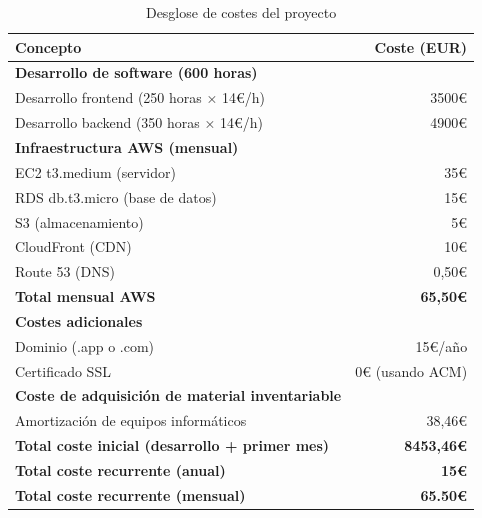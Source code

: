 \begin{table}[h]
	\centering
	\begin{tabular}{lr}
		\toprule
		\textbf{Concepto} & \textbf{Coste (EUR)} \\
		\midrule
		\textbf{Desarrollo de software (600 horas)} & \\
		\quad Desarrollo frontend (250 horas × 14€/h) & 3500€ \\
		\quad Desarrollo backend (350 horas × 14€/h) & 4900€ \\
		\midrule
		\textbf{Infraestructura AWS (mensual)} & \\
		\quad EC2 t3.medium (servidor) & 35€ \\
		\quad RDS db.t3.micro (base de datos) & 15€ \\
		\quad S3 (almacenamiento) & 5€ \\
		\quad CloudFront (CDN) & 10€ \\
		\quad Route 53 (DNS) & 0,50€ \\
		\quad \textbf{Total mensual AWS} & \textbf{65,50€} \\
		\midrule
		\textbf{Costes adicionales} & \\
		\quad Dominio (.app o .com) & 15€/año \\
		\quad Certificado SSL & 0€ (usando ACM) \\
		\midrule
		\textbf{Coste de adquisición de material inventariable} \\
		\quad Amortización de equipos informáticos & 38,46€ \\
		\midrule
		\textbf{Total coste inicial (desarrollo + primer mes)} & \textbf{8453,46€} \\
		\textbf{Total coste recurrente (anual)} & \textbf{15€} \\
		\textbf{Total coste recurrente (mensual)} & \textbf{65.50€} \\
		\bottomrule
	\end{tabular}
		\caption{Desglose de costes del proyecto}
\end{table}
